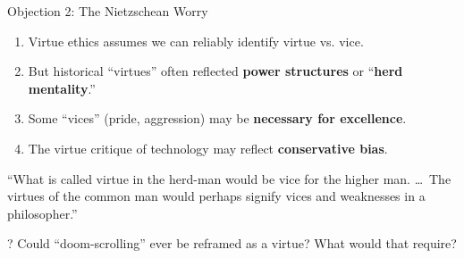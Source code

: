 \documentclass[aspectratio=169]{beamer}
\begin{document}
\begin{frame}{Objection 2: The Nietzschean Worry}
\begin{objectionbox}
\small
\begin{enumerate}
    \item Virtue ethics assumes we can reliably identify virtue vs. vice.
    \item But historical ``virtues'' often reflected \textbf{power structures} or ``\textbf{herd mentality}.''
    \item Some ``vices'' (pride, aggression) may be \textbf{necessary for excellence}.
    \item[\textbf{C.}] The virtue critique of technology may reflect \textbf{conservative bias}.
\end{enumerate}
\end{objectionbox}

\begin{quotebox}
\small ``What is called virtue in the herd-man would be vice for the higher man. \ldots\ The virtues of the common man would perhaps signify vices and weaknesses in a philosopher.''
\end{quotebox}

\begin{alertblock}{?}
Could ``doom-scrolling'' ever be reframed as a virtue? What would that require?
\end{alertblock}
\end{frame}
\end{document}
